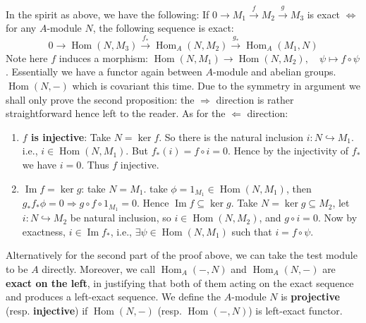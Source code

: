\documentclass[12pt]{article}
\theoremstyle{definition}
\theoremstyle{plain}
\DeclareMathOperator{\im}{Im}
\DeclareMathOperator{\Hom}{Hom}
\newcommand{\inj}{\hookrightarrow}
\begin{document}
\medskip
In the spirit as above, we have the following:
\Prop If $0\to M_1\overset{f}{\to}M_2\overset{g}{\to}M_3$ is exact $\iff$ for any $A$-module $N$, the following sequence is exact:
$$ 0\to \Hom(N, M_3)\overset{f_*}{\to} \Hom_A(N, M_2)\overset{g_*}{\to} \Hom_A(M_1, N)$$
\Rmk Note here $f$ induces a morphism: $\Hom(N,M_1)\to \Hom(N, M_2), \quad \psi\mapsto f\circ\psi$. Essentially we have a functor again between $A$-module and abelian groups. $\Hom(N, -)$ which is covariant this time. Due to the symmetry in argument we shall only prove the second proposition:
\proof the $\Rightarrow$ direction is rather straightforward hence left to the reader. As for the $\Leftarrow$ direction:
\begin{enumerate}
  \item \textbf{$f$ is injective}: Take $N=\ker f$. So there is the natural inclusion $i:N\inj M_1$. i.e., $i\in \Hom(N, M_1)$. But $f_*(i)=f\circ i=0$. Hence by the injectivity of $f_*$ we have $i=0$. Thus $f$ injective.
  \item \textbf{$\im f=\ker g$}: take $N=M_1$. take $\phi=1_{M_1}\in \Hom(N, M_1)$, then $g_*f_*\phi=0\Rightarrow g\circ f \circ 1_{M_1}=0$. Hence $\im f\subseteq \ker g$. Take $N=\ker g\subseteq M_2$, let $i:N\inj M_2$ be natural inclusion, so $i\in \Hom(N, M_2)$, and $g\circ i=0$. Now by exactness, $i\in \im f_*$, i.e., $\exists \psi\in \Hom(N, M_1)$ such that $i=f\circ \psi$.
\end{enumerate}
\Rmk Alternatively for the second part of the proof above, we can take the test module to be $A$ directly. Moreover, we call $\Hom_A(-, N)$ and $\Hom_A(N, -)$ are \textbf{exact on the left}, in justifying that both of them acting on the exact sequence and produces a left-exact sequence.
\Def We define the $A$-module $N$ is \textbf{projective} (resp. \textbf{injective}) if $\Hom(N, -)$ (resp. $\Hom(-, N)$) is left-exact functor.

\bigskip
\end{document}

